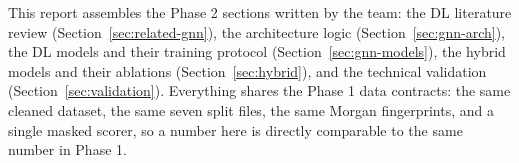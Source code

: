 \documentclass[conference]{IEEEtran}
\begin{document}
This report assembles the Phase 2 sections written by the team: the DL literature review
(Section~\ref{sec:related-gnn}), the architecture logic (Section~\ref{sec:gnn-arch}), the
DL models and their training protocol (Section~\ref{sec:gnn-models}), the hybrid models and
their ablations (Section~\ref{sec:hybrid}), and the technical validation
(Section~\ref{sec:validation}). Everything shares the Phase 1 data contracts: the same
cleaned dataset, the same seven split files, the same Morgan fingerprints, and a single
masked scorer, so a number here is directly comparable to the same number in Phase 1.














\end{document}
